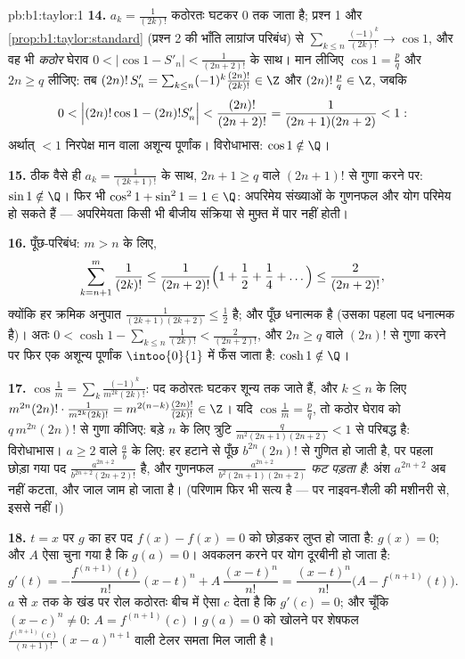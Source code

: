 \begin{solution}{pb:b1:taylor:1}
\textbf{14.} $a_k = \frac{1}{(2k)!}$ कठोरतः घटकर $0$ तक जाता है; प्रश्न 1 और
\cref{prop:b1:taylor:standard} (प्रश्न 2 की भाँति लाग्रांज परिबंध) से
$\sum_{k \leq n}\frac{(-1)^k}{(2k)!} \to \cos 1$, और वह भी \emph{कठोर} घेराव
$0 < \bigl|\cos 1 - S'_n\bigr| < \frac{1}{(2n+2)!}$ के साथ। मान लीजिए $\cos
1 = \frac pq$ और $2n \geq q$ लीजिए: तब $(2n)!\,S'_n = \sum_{k\leq n} (-1)^k
\frac{(2n)!}{(2k)!} \in \Z$ और $(2n)!\,\frac pq \in \Z$, जबकि
\[
0 < \Bigl|(2n)!\cos 1 - (2n)!S'_n\Bigr| <
\frac{(2n)!}{(2n+2)!} = \frac{1}{(2n+1)(2n+2)} < 1 :
\]
अर्थात् $< 1$ निरपेक्ष मान वाला अशून्य पूर्णांक। विरोधाभास: $\cos 1 \notin
\Q$।

\textbf{15.} ठीक वैसे ही $a_k = \frac{1}{(2k+1)!}$ के साथ, $2n + 1 \geq q$
वाले $(2n+1)!$ से गुणा करने पर: $\sin 1 \notin \Q$। फिर भी $\cos^2 1 +
\sin^2 1 = 1 \in \Q$: अपरिमेय संख्याओं के गुणनफल और योग परिमेय हो सकते हैं
--- अपरिमेयता किसी भी बीजीय संक्रिया से मुफ़्त में पार नहीं होती।

\textbf{16.} पूँछ-परिबंध: $m > n$ के लिए,
\[
\sum_{k=n+1}^{m} \frac{1}{(2k)!}
\leq \frac{1}{(2n+2)!}\Bigl(1 + \frac12 + \frac14 +
\dots\Bigr) \leq \frac{2}{(2n+2)!} ,
\]
क्योंकि हर क्रमिक अनुपात $\frac{1}{(2k+1)(2k+2)} \leq \frac12$ है; और पूँछ
धनात्मक है (उसका पहला पद धनात्मक है)। अतः $0 < \cosh 1 - \sum_{k\leq
n}\frac{1}{(2k)!} < \frac{2}{(2n+2)!}$, और $2n \geq q$ वाले $(2n)!$ से गुणा
करने पर फिर एक अशून्य पूर्णांक $\intoo{0}{1}$ में फँस जाता है: $\cosh 1
\notin \Q$।

\textbf{17.} $\cos\frac1m = \sum_k \frac{(-1)^k}{m^{2k}(2k)!}$: पद कठोरतः
घटकर शून्य तक जाते हैं, और $k \leq n$ के लिए
$m^{2n}(2n)!\cdot\frac{1}{m^{2k}(2k)!} = m^{2(n-k)}\frac{(2n)!}{(2k)!} \in
\Z$। यदि $\cos\frac1m = \frac pq$, तो कठोर घेराव को $q\,m^{2n}(2n)!$ से गुणा
कीजिए: बड़े $n$ के लिए त्रुटि $\frac{q}{m^2(2n+1)(2n+2)} < 1$ से परिबद्ध है:
विरोधाभास। $a \geq 2$ वाले $\frac ab$ के लिए: हर हटाने से पूँछ $b^{2n}(2n)!$
से गुणित हो जाती है, पर पहला छोड़ा गया पद $\frac{a^{2n+2}}{b^{2n+2}(2n+2)!}$
है, और गुणनफल $\frac{a^{2n+2}}{b^2(2n+1)(2n+2)}$ \emph{फट पड़ता है}: अंश
$a^{2n+2}$ अब नहीं कटता, और जाल जाम हो जाता है। (परिणाम फिर भी सत्य है ---
पर नाइवन-शैली की मशीनरी से, इससे नहीं।)

\textbf{18.} $t = x$ पर $g$ का हर पद $f(x) - f(x) = 0$ को छोड़कर लुप्त हो
जाता है: $g(x) = 0$; और $A$ ऐसा चुना गया है कि $g(a) = 0$। अवकलन करने पर योग
दूरबीनी हो जाता है:
\[
g'(t) = -\frac{f^{(n+1)}(t)}{n!}(x - t)^n +
A\,\frac{(x-t)^n}{n!}
= \frac{(x-t)^n}{n!}\bigl(A - f^{(n+1)}(t)\bigr) .
\]
$a$ से $x$ तक के खंड पर रोल कठोरतः बीच में ऐसा $c$ देता है कि $g'(c) = 0$;
और चूँकि $(x - c)^n \neq 0$: $A = f^{(n+1)}(c)$। $g(a) = 0$ को खोलने पर
शेषफल $\frac{f^{(n+1)}(c)}{(n+1)!}(x-a)^{n+1}$ वाली टेलर समता मिल जाती है।


\end{solution}
